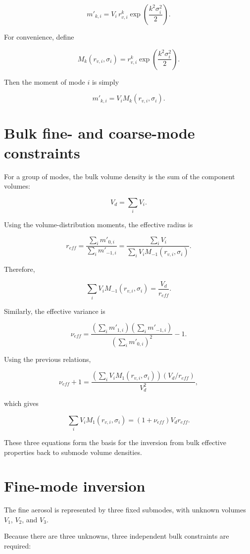 \documentclass[
  11pt,
  letterpaper,
]{scrreprt}
\begin{document}
\[
m'_{k,i} = V_i \, r_{v,i}^k \exp\left(\frac{k^2 \sigma_i^2}{2}\right).
\]

For convenience, define

\[
M_k(r_{v,i},\sigma_i)=r_{v,i}^k \exp\left(\frac{k^2 \sigma_i^2}{2}\right).
\]

Then the moment of mode \(i\) is simply

\[
m'_{k,i}=V_i M_k(r_{v,i},\sigma_i).
\]

\section{Bulk fine- and coarse-mode
constraints}\label{bulk-fine--and-coarse-mode-constraints}

For a group of modes, the bulk volume density is the sum of the
component volumes:

\[
V_d = \sum_i V_i.
\]

Using the volume-distribution moments, the effective radius is

\[
r_{eff}=\frac{\sum_i m'_{0,i}}{\sum_i m'_{-1,i}}
       =\frac{\sum_i V_i}{\sum_i V_i M_{-1}(r_{v,i},\sigma_i)}.
\]

Therefore,

\[
\sum_i V_i M_{-1}(r_{v,i},\sigma_i)=\frac{V_d}{r_{eff}}.
\]

Similarly, the effective variance is

\[
\nu_{eff}=\frac{\left(\sum_i m'_{1,i}\right)\left(\sum_i m'_{-1,i}\right)}
{\left(\sum_i m'_{0,i}\right)^2}-1.
\]

Using the previous relations,

\[
\nu_{eff}+1
=\frac{\left(\sum_i V_i M_1(r_{v,i},\sigma_i)\right)\left(V_d/r_{eff}\right)}{V_d^2},
\]

which gives

\[
\sum_i V_i M_1(r_{v,i},\sigma_i)
=(1+\nu_{eff})V_d r_{eff}.
\]

These three equations form the basis for the inversion from bulk
effective properties back to submode volume densities.

\section{Fine-mode inversion}\label{fine-mode-inversion}

The fine aerosol is represented by three fixed submodes, with unknown
volumes \(V_1\), \(V_2\), and \(V_3\).

Because there are three unknowns, three independent bulk constraints are
required:
\end{document}

